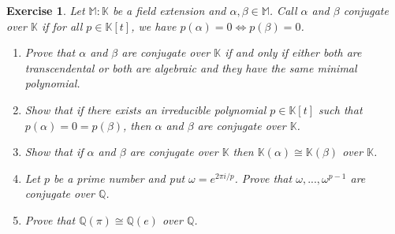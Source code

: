 \documentclass{article}
\newtheorem{exercise}[theorem]{Exercise}
\begin{document}
\begin{exercise}
Let $\mathbb{M}:\mathbb{K}$ be a field extension and $\alpha,\beta\in \mathbb{M}$. Call $\alpha$ and $\beta$ conjugate over $\mathbb{K}$ if for all $p\in \mathbb{K}[t]$, we have $p(\alpha)=0\iff p(\beta)=0$.
\begin{enumerate}[label=(\roman*)]
    \item Prove that $\alpha$ and $\beta$ are conjugate over $\mathbb{K}$ if and only if either both are transcendental or both are algebraic and they have the same minimal polynomial.
    \item Show that if there exists an irreducible polynomial $p\in \mathbb{K}[t]$ such that $p(\alpha)=0=p(\beta)$, then $\alpha$ and $\beta$ are conjugate over $\mathbb{K}$.
    \item Show that if $\alpha$ and $\beta$ are conjugate over $\mathbb{K}$ then $\mathbb{K}(\alpha)\cong\mathbb{K}(\beta)$ over $\mathbb{K}$.
    \item Let $p$ be a prime number and put $\omega=e^{2\pi i/p}$. Prove that $\omega,...,\omega^{p-1}$ are conjugate over $\mathbb{Q}$.
    \item Prove that $\mathbb{Q}(\pi)\cong\mathbb{Q}(e)$ over $\mathbb{Q}$.
\end{enumerate}
\end{exercise}
\end{document}
